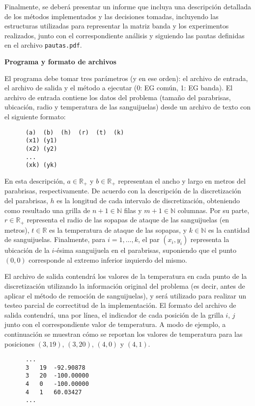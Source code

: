 \documentclass[double, 1.5in, 12pt]{beavtex}
\newcommand{\real}{\mathbb{R}}
\newcommand{\nat}{\mathbb{N}}
\newcommand{\atacante}{sanguijuela}
\newcommand{\objeto}{parabrisas}
\begin{document}
Finalmente, se deber\'a presentar un informe que incluya una descripci\'on detallada de los m\'etodos implementados y las decisiones tomadas, incluyendo las estructuras utilizadas para representar la matriz banda  y los experimentos realizados, junto con el correspondiente an\'alisis y siguiendo las pautas definidas en el archivo \verb+pautas.pdf+.

{\noindent \bf Programa y formato de archivos}

El programa debe tomar tres par\'ametros (y en ese orden): el archivo de entrada, el archivo de salida y el m\'etodo a ejecutar (0: EG com\'un, 1: EG banda).
El archivo de entrada contiene los datos del problema (tama\~no del
\objeto, ubicaci\'on, radio y temperatura de las \atacante s) desde un
archivo de texto con el siguiente formato:

\begin{verbatim}
      (a)  (b)  (h)  (r)  (t)  (k)
      (x1) (y1)
      (x2) (y2)
      ...
      (xk) (yk)
\end{verbatim}

En esta descripci\'on, $a\in\real_+$ y $b\in\real_+$ representan el ancho
y largo en metros del \objeto, respectivamente. De acuerdo con la descripci\'on
de la discretizaci\'on del \objeto, $h$ es la longitud de cada intervalo de discretizaci\'on,
obteniendo como resultado una grilla de $n+1\in\nat$ filas y $m+1\in\nat$ columnas.
Por su parte, $r\in\real_+$ representa el radio de las sopapas de ataque de las
\atacante s (en metros), $t\in\real$ es la temperatura de ataque de las sopapas,
y $k\in\nat$ es la cantidad de \atacante s. Finalmente, para $i=1,\dots,k$,
el par $(x_i,y_i)$ representa la ubicaci\'on de la $i$-\'esima sanguijuela en el
\objeto, suponiendo que el punto $(0,0)$  corresponde al extremo inferior
izquierdo del mismo.

El archivo de salida contendr\'a los valores de la temperatura en cada punto de la discretizaci\'on utilizando la informaci\'on original del problema (es decir, antes de aplicar el m\'etodo de remoci\'on de sanguijuelas), y ser\'a utilizado para realizar un testeo parcial de correctitud de la implementaci\'on. El formato del archivo de salida contendr\'a, una por l\'inea, el indicador de cada posici\'on de la grilla $i$, $j$ junto con el correspondiente valor de temperatura. A modo de ejemplo, a continuaci\'on se muestran c\'omo se reportan los valores de temperatura para las posiciones $(3,19)$, $(3,20)$, $(4,0)$ y $(4,1)$. 

\begin{verbatim}
      ...
      3   19  -92.90878
      3   20  -100.00000
      4   0   -100.00000
      4   1   60.03427
      ...
\end{verbatim}
\end{document}
